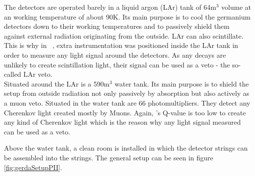 \documentclass[encoding=utf8,british]{tumphthesis}
\begin{document}
The detectors are operated barely in a liquid argon (LAr) tank of 64m$^3$ volume at an working temperature of about 90K.
Its main purpose is to cool the germanium detectors down to their working temperatures and to passively shield them against external radiation originating from the outside.
LAr can also scintillate.
This is why in \PII\ , extra instrumentation was positioned inside the LAr tank in order to measure any light signal around the detectors.
As any  decays are unlikely to create scintillation light, their signal can be used as a veto - the so-called LAr veto.
\\

Situated around the LAr is a 590m$^3$ water tank.
Its main purpose is to shield the setup from outside radiation not only passively by absorption but also actively as a muon veto.
Situated in the water tank are 66 photomultipliers.
They detect any Cherenkov light created mostly by Muons.
Again, 's Q-value is too low to create any kind of Cherenkov light which is the reason why any light signal measured can be used as a veto.

Above the water tank, a clean room is installed in which the detector strings can be assembled into the strings.  
The general setup can be seen in figure \ref{fig:gerdaSetupPII}.
\\
\end{document}
